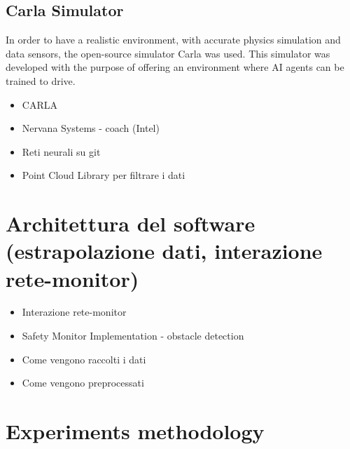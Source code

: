 \subsection{Carla Simulator}

In order to have a realistic environment, with accurate physics simulation and data sensors, the open-source simulator Carla was used. This simulator was developed with the purpose of offering an environment where AI agents can be trained to drive.\newline

\begin{itemize}
	\item CARLA
	\item Nervana Systems - coach (Intel)
	\item Reti neurali su git
	\item Point Cloud Library per filtrare i dati
\end{itemize}

\section{Architettura del software (estrapolazione dati, interazione rete-monitor)}

\begin{itemize}
	
	\item Interazione rete-monitor
	\item Safety Monitor Implementation - obstacle detection
	\item Come vengono raccolti i dati
	\item Come vengono preprocessati
	
\end{itemize}

\section{Experiments methodology}

